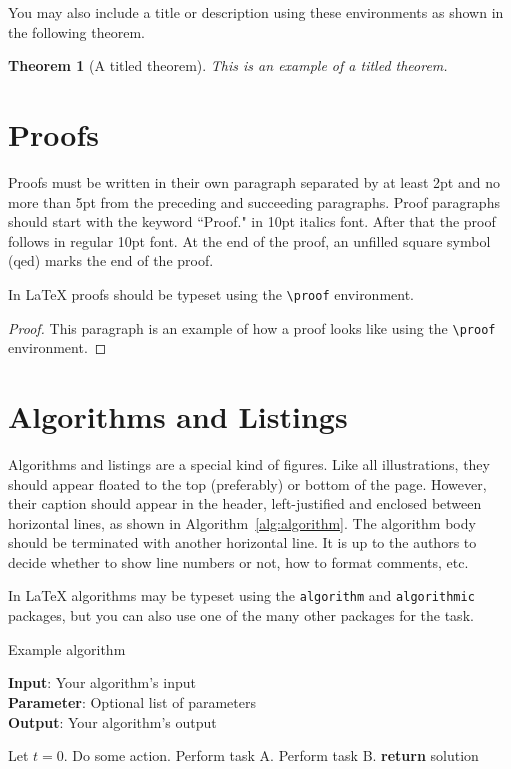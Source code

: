 \documentclass{article}
\newtheorem{theorem}{Theorem}
\begin{document}
You may also include a title or description using these environments as shown in the following theorem.

\begin{theorem}[A titled theorem]
This is an example of a titled theorem.
\end{theorem}

\section{Proofs}

Proofs must be written in their own paragraph separated by at least 2pt and no more than 5pt from the preceding and succeeding paragraphs. Proof paragraphs should start with the keyword ``Proof." in 10pt italics font. After that the proof follows in regular 10pt font. At the end of the proof, an unfilled square symbol (qed) marks the end of the proof.

In \LaTeX{} proofs should be typeset using the \texttt{\textbackslash{proof}} environment.

\begin{proof}
This paragraph is an example of how a proof looks like using the \texttt{\textbackslash{proof}} environment.
\end{proof}


\section{Algorithms and Listings}

Algorithms and listings are a special kind of figures. Like all illustrations, they should appear floated to the top (preferably) or bottom of the page. However, their caption should appear in the header, left-justified and enclosed between horizontal lines, as shown in Algorithm~\ref{alg:algorithm}. The algorithm body should be terminated with another horizontal line. It is up to the authors to decide whether to show line numbers or not, how to format comments, etc.

In \LaTeX{} algorithms may be typeset using the {\tt algorithm} and {\tt algorithmic} packages, but you can also use one of the many other packages for the task.

\begin{algorithm}[tb]
\caption{Example algorithm}
\label{alg:algorithm}
\textbf{Input}: Your algorithm's input\\
\textbf{Parameter}: Optional list of parameters\\
\textbf{Output}: Your algorithm's output
\begin{algorithmic}[1] %
\STATE Let $t=0$.
\STATE Do some action.
\STATE Perform task A.
\ELSE
\STATE Perform task B.
\ENDIF
\ENDWHILE
\STATE \textbf{return} solution
\end{algorithmic}
\end{algorithm}
\end{document}
